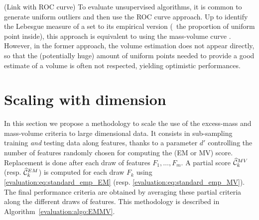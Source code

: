 \begin{remark}({\sc Link with ROC curve})
To evaluate unsupervised algorithms, it is common to generate uniform outliers and then use the ROC curve approach. Up to identify the Lebesgue measure of a set to its empirical version (\ie~the proportion of uniform point inside),
this approach is equivalent to using the mass-volume curve \cite{CLEM14}.
 However, in the former approach, the volume estimation does not appear directly, so that the (potentially huge) amount of uniform points needed to provide a good estimate of a volume is often not respected, yielding optimistic performances.
\end{remark}
\section{Scaling with dimension}
\label{evaluation:scaling-dim}
In this section we propose a methodology to scale the use of the excess-mass and mass-volume criteria to large dimensional data. It consists in sub-sampling training \emph{and} testing data along features, thanks to a parameter $d'$ controlling the number of features randomly chosen for computing the (EM or MV) score. Replacement is done after each draw of features $F_1,\ldots,F_{m}$. A partial score $\widehat {\mathcal{C}}_k^{MV}$ (resp. $\widehat {\mathcal{C}}_k^{EM}$) is computed for each draw $F_k$ using \eqref{evaluation:eq:standard_emp_EM} (resp. \eqref{evaluation:eq:standard_emp_MV}). The final performance criteria are obtained by averaging these partial criteria along the different draws of features. This methodology is described in Algorithm~\ref{evaluation:algo:EMMV}.
%
%
